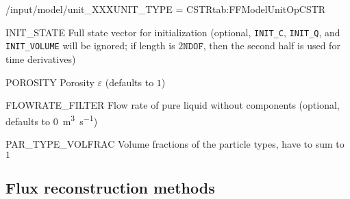 \begin{condsubgroup}{/input/model/unit\_XXX}{UNIT\_TYPE = CSTR}{tab:FFModelUnitOpCSTR}
\begin{dataset}[unit=various,type=double,range={$\mathds{R}$},length={\texttt{NDOF} / $2\texttt{NDOF}$}]{INIT\_STATE}
    Full state vector for initialization (optional, \texttt{INIT\_C}, \texttt{INIT\_Q}, and \texttt{INIT\_VOLUME} will be ignored; if length is $2\texttt{NDOF}$, then the second half is used for time derivatives)
  \end{dataset}
  \begin{dataset}[unit=--,type=double,range={$(0,1]$},length={1}]{POROSITY}
    Porosity $\varepsilon$ (defaults to $1$)
  \end{dataset}
  \begin{dataset}[unit=\si{\cubic\metre\per\second},type=double,range={$\geq 0$},length={1 / \texttt{NSEC}}]{FLOWRATE\_FILTER}
    Flow rate of pure liquid without components (optional, defaults to \SI{0}{\cubic\metre\per\second})
  \end{dataset}
  \begin{dataset}[unit=--,type=double,range={$[0,1]$},length={\texttt{NPARTYPE}}]{PAR\_TYPE\_VOLFRAC}
    Volume fractions of the particle types, have to sum to $1$
  \end{dataset}
\end{condsubgroup}

\subsection{Flux reconstruction methods}

